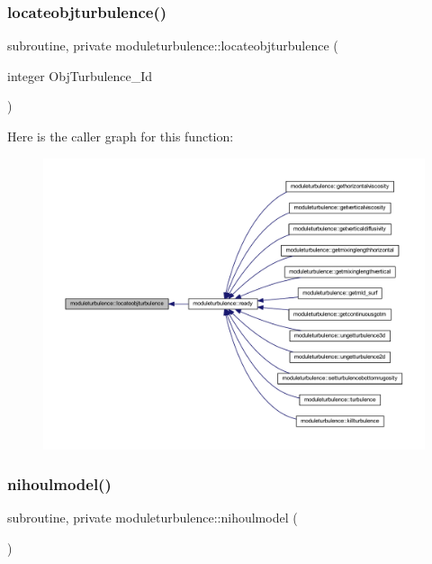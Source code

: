 \subsubsection{\texorpdfstring{locateobjturbulence()}{locateobjturbulence()}}
{\footnotesize\ttfamily subroutine, private moduleturbulence\+::locateobjturbulence (\begin{DoxyParamCaption}\item[{integer}]{Obj\+Turbulence\+\_\+\+Id }\end{DoxyParamCaption})\hspace{0.3cm}{\ttfamily [private]}}

Here is the caller graph for this function\+:\nopagebreak
\begin{figure}[H]
\begin{center}
\leavevmode
\includegraphics[width=350pt]{namespacemoduleturbulence_a36b249a1813247cecf28481893bc0ea2_icgraph}
\end{center}
\end{figure}
\mbox{\label{namespacemoduleturbulence_a403c337f711237d4bc2b5d439e974a19}} 
\subsubsection{\texorpdfstring{nihoulmodel()}{nihoulmodel()}}
{\footnotesize\ttfamily subroutine, private moduleturbulence\+::nihoulmodel (\begin{DoxyParamCaption}{ }\end{DoxyParamCaption})\hspace{0.3cm}{\ttfamily [private]}}

